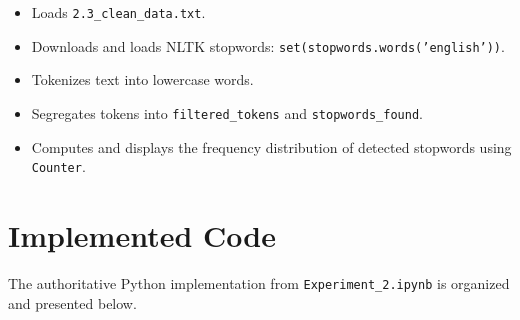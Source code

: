 \begin{enumerate}
    \begin{itemize}
        \item Loads \texttt{2.3\_clean\_data.txt}.
        \item Downloads and loads NLTK stopwords: \texttt{set(stopwords.words('english'))}.
        \item Tokenizes text into lowercase words.
        \item Segregates tokens into \texttt{filtered\_tokens} and \texttt{stopwords\_found}.
        \item Computes and displays the frequency distribution of detected stopwords using \texttt{Counter}.
    \end{itemize}
\end{enumerate}

\section{Implemented Code}
The authoritative Python implementation from \texttt{Experiment\_2.ipynb} is organized and presented below.

